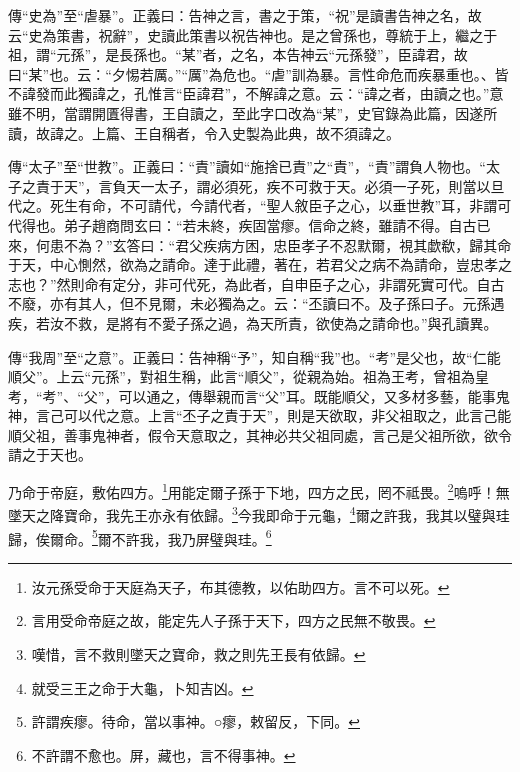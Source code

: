{\noindent\zhuan{}\fzbyks 傳“史為”至“虐暴”。正義曰：告神之言，書之于策，“祝”是讀書告神之名，故云“史為策書，祝辭”，史讀此策書以祝告神也。是之曾孫也，尊統于上，繼之于祖，謂“元孫”，是長孫也。“某”者，之名，本告神云“元孫發”，臣諱君，故曰“某”也。云：“夕惕若厲。”“厲”為危也。“虐”訓為暴。言性命危而疾暴重也。、皆不諱發而此獨諱之，孔惟言“臣諱君”，不解諱之意。云：“諱之者，由讀之也。”意雖不明，當謂開匱得書，王自讀之，至此字口改為“某”，史官錄為此篇，因遂所讀，故諱之。上篇、王自稱者，令入史製為此典，故不須諱之。 \par}

{\noindent\zhuan{}\fzbyks 傳“太子”至“世教”。正義曰：“責”讀如“施捨已責”之“責”，“責”謂負人物也。“太子之責于天”，言負天一太子，謂必須死，疾不可救于天。必須一子死，則當以旦代之。死生有命，不可請代，今請代者，“聖人敘臣子之心，以垂世教”耳，非謂可代得也。弟子趙商問玄曰：“若未終，疾固當瘳。信命之終，雖請不得。自古已來，何患不為？”玄答曰：“君父疾病方困，忠臣孝子不忍默爾，視其歔欷，歸其命于天，中心惻然，欲為之請命。達于此禮，著在，若君父之病不為請命，豈忠孝之志也？”然則命有定分，非可代死，為此者，自申臣子之心，非謂死實可代。自古不廢，亦有其人，但不見爾，未必獨為之。云：“丕讀曰不。及子孫曰子。元孫遇疾，若汝不救，是將有不愛子孫之過，為天所責，欲使為之請命也。”與孔讀異。 \par}

{\noindent\zhuan{}\fzbyks 傳“我周”至“之意”。正義曰：告神稱“予”，知自稱“我”也。“考”是父也，故“仁能順父”。上云“元孫”，對祖生稱，此言“順父”，從親為始。祖為王考，曾祖為皇考，“考”、“父”，可以通之，傳舉親而言“父”耳。既能順父，又多材多藝，能事鬼神，言己可以代之意。上言“丕子之責于天”，則是天欲取，非父祖取之，此言己能順父祖，善事鬼神者，假令天意取之，其神必共父祖同處，言己是父祖所欲，欲令請之于天也。 \par}

乃命于帝庭，敷佑四方。\footnote{汝元孫受命于天庭為天子，布其德教，以佑助四方。言不可以死。}用能定爾子孫于下地，四方之民，罔不祗畏。\footnote{言用受命帝庭之故，能定先人子孫于天下，四方之民無不敬畏。}嗚呼！無墜天之降寶命，我先王亦永有依歸。\footnote{嘆惜，言不救則墜天之寶命，救之則先王長有依歸。}今我即命于元龜，\footnote{就受三王之命于大龜，卜知吉凶。}爾之許我，我其以璧與珪歸，俟爾命。\footnote{許謂疾瘳。待命，當以事神。○瘳，敕留反，下同。}爾不許我，我乃屏璧與珪。\footnote{不許謂不愈也。屏，藏也，言不得事神。}

